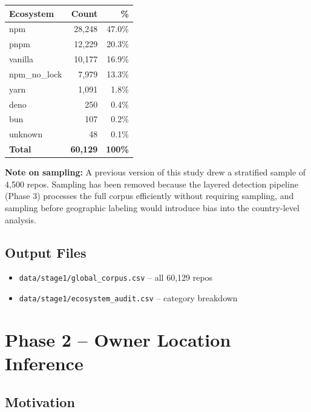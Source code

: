 \documentclass[12pt,a4paper]{article}
\begin{document}
\begin{table}[h]
\centering
\begin{tabular}{@{}lrr@{}}
\toprule
Ecosystem & Count & \% \\
\midrule
npm           & 28,248 & 47.0\% \\
pnpm          & 12,229 & 20.3\% \\
vanilla       & 10,177 & 16.9\% \\
npm\_no\_lock &  7,979 & 13.3\% \\
yarn          &  1,091 &  1.8\% \\
deno          &    250 &  0.4\% \\
bun           &    107 &  0.2\% \\
unknown       &     48 &  0.1\% \\
\textbf{Total} & \textbf{60,129} & \textbf{100\%} \\
\bottomrule
\end{tabular}
\end{table}

\noindent\textbf{Note on sampling:} A previous version of this study drew a stratified
sample of 4,500 repos. Sampling has been removed because the layered detection pipeline
(Phase 3) processes the full corpus efficiently without requiring sampling, and sampling
before geographic labeling would introduce bias into the country-level analysis.

\subsection{Output Files}
\begin{itemize}
  \item \texttt{data/stage1/global\_corpus.csv} -- all 60,129 repos
  \item \texttt{data/stage1/ecosystem\_audit.csv} -- category breakdown
\end{itemize}

\section{Phase 2 -- Owner Location Inference}

\subsection{Motivation}
\end{document}
